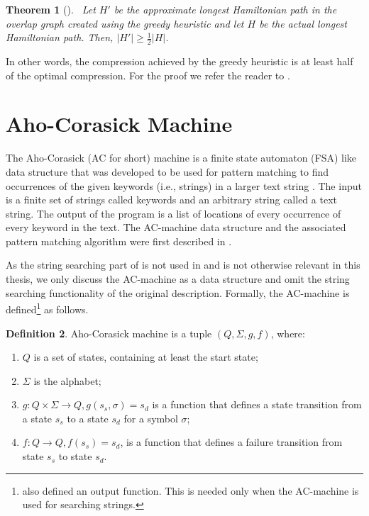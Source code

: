 \documentclass[english,twoside,censored,csm,algorithms-track-2020]{HYthesisML}
\theoremstyle{plain}
\newtheorem{theorem}{Theorem}[chapter]
\theoremstyle{definition}
\newtheorem{definition}[theorem]{Definition}
\begin{document}
\begin{theorem}[]~\label{theorem-heuristic-bound}
  Let $H'$ be the approximate longest Hamiltonian path in the overlap graph created using
  the greedy heuristic and let $H$ be the actual longest Hamiltonian path. Then,
  $|H'|\geq \frac{1}{2}|H|$.
\end{theorem}

In other words, the compression achieved by the greedy heuristic is at least half of the optimal
compression. 
For the proof we refer the reader to \citep{Tarhio88}.




\section{Aho-Corasick Machine}


  
The Aho-Corasick (AC for short) machine is a finite state automaton (FSA) like data structure that was
developed to be used
for pattern matching to find occurrences of the given keywords (i.e., strings) in a larger text string \citep{Aho75}.
The input is a finite set of strings called keywords and an
arbitrary string called a text string. The output of the program is a list of locations of every
occurrence of every keyword in the text. The AC-machine data structure and the associated pattern
matching algorithm were first described in \citep{Aho75}.

As the string searching part of \citep{Aho75} is not used in \citep{Ukkonen90} and is not otherwise
relevant in this thesis, we only discuss the AC-machine as a data structure and omit the string searching
functionality of the original description.
Formally, the AC-machine is defined\footnote{\citep{Aho75} also defined an output function.
This is needed only when the AC-machine is used for searching strings.} as follows.

\begin{definition}
  Aho-Corasick machine is a tuple $(Q, \Sigma, g, f)$, where:
\begin{enumerate}[leftmargin=28pt]
\item $Q$ is a set of states, containing at least the start state;
\item $\Sigma$ is the alphabet;
\item $g : Q \times \Sigma \rightarrow Q, g(s_s,\sigma) = s_d$ is a function that defines a state transition from a state $s_s$ to a state $s_d$ for a symbol $\sigma$;
\item $f : Q \rightarrow Q, f(s_s) = s_d$, is a function that defines a failure transition from state $s_s$ to state $s_d$.
\end{enumerate}
\end{definition}
\end{document}
